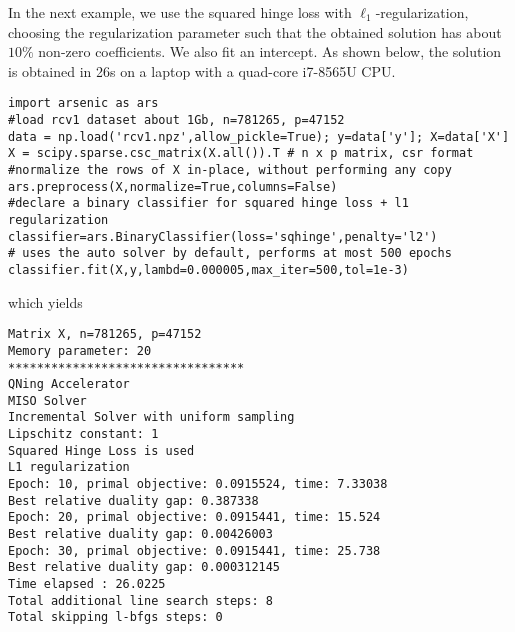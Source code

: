\documentclass{article}
\begin{document}
In the next example, we use the squared hinge loss with
$\ell_1$-regularization, choosing the regularization parameter such that the
obtained solution has about $10\%$ non-zero coefficients.
We also fit an intercept. As shown below, the solution is obtained in 26s on a
laptop with a quad-core i7-8565U CPU.
\begin{verbatim}
import arsenic as ars
#load rcv1 dataset about 1Gb, n=781265, p=47152
data = np.load('rcv1.npz',allow_pickle=True); y=data['y']; X=data['X']
X = scipy.sparse.csc_matrix(X.all()).T # n x p matrix, csr format 
#normalize the rows of X in-place, without performing any copy
ars.preprocess(X,normalize=True,columns=False) 
#declare a binary classifier for squared hinge loss + l1 regularization
classifier=ars.BinaryClassifier(loss='sqhinge',penalty='l2')
# uses the auto solver by default, performs at most 500 epochs
classifier.fit(X,y,lambd=0.000005,max_iter=500,tol=1e-3) 
\end{verbatim}
which yields
\begin{verbatim}
Matrix X, n=781265, p=47152
Memory parameter: 20
*********************************
QNing Accelerator
MISO Solver
Incremental Solver with uniform sampling
Lipschitz constant: 1
Squared Hinge Loss is used
L1 regularization
Epoch: 10, primal objective: 0.0915524, time: 7.33038
Best relative duality gap: 0.387338
Epoch: 20, primal objective: 0.0915441, time: 15.524
Best relative duality gap: 0.00426003
Epoch: 30, primal objective: 0.0915441, time: 25.738
Best relative duality gap: 0.000312145
Time elapsed : 26.0225
Total additional line search steps: 8
Total skipping l-bfgs steps: 0
\end{verbatim}
\end{document}
